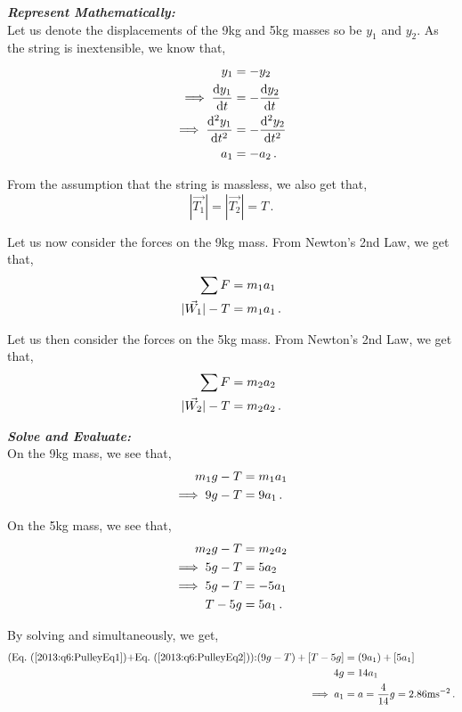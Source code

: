 \begin{subquestions}
\begin{subsubquestions}
\textbf{\textit{Represent Mathematically:}} \\ 
Let us denote the displacements of the 9kg and 5kg masses so be $y_1$ and $y_2$. As the string is inextensible, we know that,
\begin{align}
	y_1 & = -y_2 \nonumber \\
	\implies \frac{\mathrm{d}y_1}{\mathrm{d}t} & = -\frac{\mathrm{d}y_2}{\mathrm{d}t} \nonumber \\
	\implies \frac{\mathrm{d}^2y_1}{\mathrm{d}t^2} & = -\frac{\mathrm{d}^2y_2}{\mathrm{d}t^2} \nonumber \\
	a_1 & = -a_2 \,.
\end{align}

From the assumption that the string is massless, we also get that,
\begin{equation}
	|\vec{T_1}| = |\vec{T_2}| = T \,.
\end{equation}

Let us now consider the forces on the 9kg mass. From Newton's 2nd Law, we get that,
\begin{align}
	\sum F & = m_1a_1 \nonumber \\
	|\vec{W_1}| - T & = m_1a_1 \,.
\end{align}

Let us then consider the forces on the 5kg mass. From Newton's 2nd Law, we get that,
\begin{align}
	\sum F & = m_2a_2 \nonumber \\
	|\vec{W_2}|-T & = m_2a_2 \,.
\end{align}




\textbf{\textit{Solve and Evaluate:}} \\
On the 9kg mass, we see that,
\begin{align}
	m_1g - T & = m_1a_1 \nonumber \\
	\implies 9g-T & = 9a_1 \,. \label{2013:q6:PulleyEq1}
\end{align}

On the 5kg mass, we see that,
\begin{align}
	m_2g - T & = m_2a_2 \nonumber \\
	\implies 5g-T & = 5a_2 \nonumber \\
	\implies 5g-T & = -5a_1 \nonumber \\
	T-5g & = 5a_1 \,. \label{2013:q6:PulleyEq2}
\end{align}

By solving  and  simultaneously, we get,
\begin{align}
	\text{(\req{2013:q6:PulleyEq1}+\req{2013:q6:PulleyEq2}):} (9g-T)+[T-5g] & = (9a_1)+[5a_1] \nn \\
	4g & = 14a_1 \nn \\
	\implies a_1 & = a = \frac{4}{14}g = 2.86\text{ms}^{-2} \,.
\end{align}


\end{subsubquestions}
\end{subquestions}
